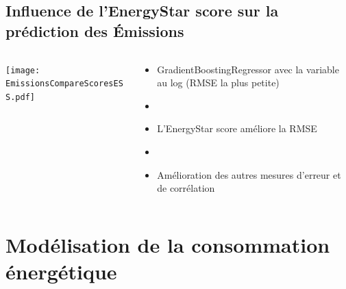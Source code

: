 \documentclass[8pt,aspectratio=169,hyperref={unicode=true}]{beamer}
\begin{document}
\subsection{Influence de l'EnergyStar score sur la prédiction des Émissions}
\begin{frame}{\insertsubsection}
  \begin{columns}
    \begin{column}{.6\textwidth}
      \centering
      \texttt{[image: EmissionsCompareScoresESS.pdf]}
    \end{column}
    \begin{column}{.4\textwidth}
      \begin{itemize}
        \item GradientBoostingRegressor avec la variable au log (RMSE la plus petite)
        \item[]
        \item L'EnergyStar score améliore la RMSE
        \item[]
        \item Amélioration des autres mesures d'erreur et de corrélation
      \end{itemize}
    \end{column}
  \end{columns}
\end{frame}

\section[Modélisation consommation]{Modélisation de la consommation énergétique}
\end{document}
